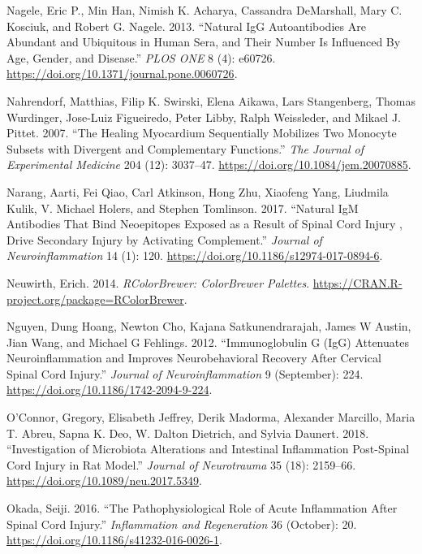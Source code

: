 \documentclass[9pt,lineno]{elife}
\newlength{\cslhangindent}
\newlength{\cslentryspacingunit} %
\newenvironment{CSLReferences}[2] %
 {%
  \setlength{\parindent}{0pt}
  \ifodd #1
  \let\oldpar\par
  \def\par{\hangindent=\cslhangindent\oldpar}
  \fi
  \setlength{\parskip}{#2\cslentryspacingunit}
 }%
 {}
\begin{document}
\begin{CSLReferences}{1}{0}
\leavevmode{}%
Nagele, Eric P., Min Han, Nimish K. Acharya, Cassandra DeMarshall, Mary C. Kosciuk, and Robert G. Nagele. 2013. {``Natural {IgG Autoantibodies Are Abundant} and {Ubiquitous} in {Human Sera}, and {Their Number Is Influenced By Age}, {Gender}, and {Disease}.''} \emph{PLOS ONE} 8 (4): e60726. \url{https://doi.org/10.1371/journal.pone.0060726}.

\leavevmode{}%
Nahrendorf, Matthias, Filip K. Swirski, Elena Aikawa, Lars Stangenberg, Thomas Wurdinger, Jose-Luiz Figueiredo, Peter Libby, Ralph Weissleder, and Mikael J. Pittet. 2007. {``The Healing Myocardium Sequentially Mobilizes Two Monocyte Subsets with Divergent and Complementary Functions.''} \emph{The Journal of Experimental Medicine} 204 (12): 3037--47. \url{https://doi.org/10.1084/jem.20070885}.

\leavevmode{}%
Narang, Aarti, Fei Qiao, Carl Atkinson, Hong Zhu, Xiaofeng Yang, Liudmila Kulik, V. Michael Holers, and Stephen Tomlinson. 2017. {``Natural {IgM} Antibodies That Bind Neoepitopes Exposed as a Result of Spinal Cord Injury , Drive Secondary Injury by Activating Complement.''} \emph{Journal of Neuroinflammation} 14 (1): 120. \url{https://doi.org/10.1186/s12974-017-0894-6}.

\leavevmode{}%
Neuwirth, Erich. 2014. \emph{RColorBrewer: ColorBrewer Palettes}. \url{https://CRAN.R-project.org/package=RColorBrewer}.

\leavevmode{}%
Nguyen, Dung Hoang, Newton Cho, Kajana Satkunendrarajah, James W Austin, Jian Wang, and Michael G Fehlings. 2012. {``Immunoglobulin {G} ({IgG}) Attenuates Neuroinflammation and Improves Neurobehavioral Recovery After Cervical Spinal Cord Injury.''} \emph{Journal of Neuroinflammation} 9 (September): 224. \url{https://doi.org/10.1186/1742-2094-9-224}.

\leavevmode{}%
O'Connor, Gregory, Elisabeth Jeffrey, Derik Madorma, Alexander Marcillo, Maria T. Abreu, Sapna K. Deo, W. Dalton Dietrich, and Sylvia Daunert. 2018. {``Investigation of {Microbiota Alterations} and {Intestinal Inflammation Post-Spinal Cord Injury} in {Rat Model}.''} \emph{Journal of Neurotrauma} 35 (18): 2159--66. \url{https://doi.org/10.1089/neu.2017.5349}.

\leavevmode{}%
Okada, Seiji. 2016. {``The Pathophysiological Role of Acute Inflammation After Spinal Cord Injury.''} \emph{Inflammation and Regeneration} 36 (October): 20. \url{https://doi.org/10.1186/s41232-016-0026-1}.


\end{CSLReferences}
\end{document}
